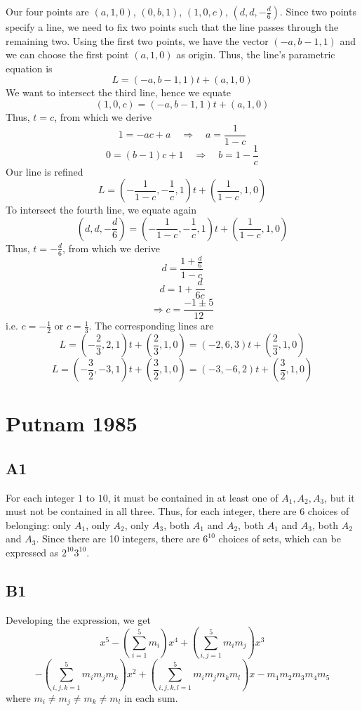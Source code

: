 \documentclass{book}
\begin{document}
Our four points are $(a, 1, 0)$, $(0, b, 1)$, $(1, 0, c)$, $\left(d, d, -\frac{d}{6}\right)$. Since two points specify a line, we need to fix two points such that the line passes through the remaining two. Using the first two points, we have the vector $(-a, b - 1, 1)$ and we can choose the first point $(a, 1, 0)$ as origin. Thus, the line's parametric equation is
$$L = (-a, b - 1, 1) t + (a, 1, 0)$$
We want to intersect the third line, hence we equate
$$(1, 0, c) = (-a, b - 1, 1) t + (a, 1, 0)$$
Thus, $t = c$, from which we derive
$$1 = -ac + a \quad \Rightarrow \quad a = \frac{1}{1 - c}$$
$$0 = (b - 1)c + 1 \quad \Rightarrow \quad b = 1 - \frac{1}{c}$$
Our line is refined
$$L = \left( -\frac{1}{1 - c}, -\frac{1}{c}, 1 \right) t + \left( \frac{1}{1 - c}, 1, 0 \right)$$
To intersect the fourth line, we equate again
$$\left(d, d, -\frac{d}{6}\right) = \left( -\frac{1}{1 - c}, -\frac{1}{c}, 1 \right) t + \left( \frac{1}{1 - c}, 1, 0 \right)$$
Thus, $t = -\frac{d}{6}$, from which we derive
$$d = \frac{1 + \frac{d}{6}}{1 - c}$$
$$d = 1 + \frac{d}{6c}$$
$$\Rightarrow c = \frac{-1 \pm 5}{12}$$
i.e. $c = -\frac{1}{2}$ or $c = \frac{1}{3}$. The corresponding lines are
$$L = \left( -\frac{2}{3}, 2, 1 \right)t + \left( \frac{2}{3}, 1, 0 \right) = \left( -2, 6, 3 \right)t + \left( \frac{2}{3}, 1, 0 \right)$$
$$L = \left( -\frac{3}{2}, -3, 1 \right)t + \left( \frac{3}{2}, 1, 0 \right) = \left( -3, -6, 2 \right)t + \left( \frac{3}{2}, 1, 0 \right)$$

\chapter{Putnam 1985}

\section*{A1}
For each integer $1$ to $10$, it must be contained in at least one of $A_1, A_2, A_3$, but it must not be contained in all three. Thus, for each integer, there are 6 choices of belonging: only $A_1$, only $A_2$, only $A_3$, both $A_1$ and $A_2$, both $A_1$ and $A_3$, both $A_2$ and $A_3$. Since there are 10 integers, there are $6^{10}$ choices of sets, which can be expressed as $2^{10} 3^{10}$.

\section*{B1}
Developing the expression, we get
$$x^5 - \left( \sum_{i = 1}^5 m_i \right) x^4 + \left( \sum_{i, j = 1}^5 m_i m_j \right) x^3$$
$$- \left( \sum_{i, j, k = 1}^5 m_i m_j m_k \right) x^2 + \left( \sum_{i, j, k, l = 1}^5 m_i m_j m_k m_l \right) x - m_1m_2m_3m_4m_5$$
where $m_i \neq m_j \neq m_k \neq m_l$ in each sum.
\end{document}
